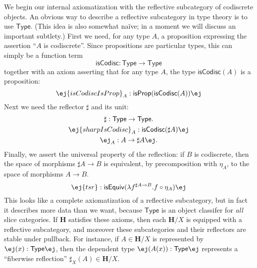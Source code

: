 \documentclass[copyright]{eptcs}
\makeatletter
\newcommand{\type}{\ensuremath{\mathsf{Type}}\xspace}
\newcommand{\ig}{\ensuremath{\infty\text{-}\mathbf{Gpd}}\xspace}
\renewcommand{\H}{\ensuremath{\mathbf{H}}\xspace}
\newcommand{\io}{\ensuremath{(\infty,1)}}
\newcommand{\sharpsub}[1]{\sharp_{\scriptscriptstyle #1}}
\def\jd#1{\@jd#1\ej}
\def\@jd#1|-#2\ej{\@@jd#1,,\;\vdash\;\left(#2\right)}
\def\@@jd#1,{\@ifmtarg{#1}{\let\next=\relax}{\left(#1\right)\let\next=\@@@jd}\next}
\def\@@@jd#1,{\@ifmtarg{#1}{\let\next=\relax}{,\,\left(#1\right)\let\next=\@@@jd}\next}
\makeatother
\begin{document}

We begin our internal axiomatization with the reflective subcategory of codiscrete objects.
An obvious
way to describe a reflective subcategory in type theory is to use \type.
(This idea is also somewhat na\"ive; in a moment we will discuss an important subtlety.)
First we need, for any type $A$, a proposition expressing the assertion ``$A$ is codiscrete''.
Since propositions are particular types, this can simply be a function term
\begin{equation}
  \mathsf{isCodisc} : \type \to \type
\end{equation}
together with an axiom asserting that for any type $A$, the type $\mathsf{isCodisc}(A)$ is a proposition:
\begin{equation}
  \jd{A:\type |- \mathsf{isCodiscIsProp}_A : \mathsf{isProp} (\mathsf{isCodisc}(A))}
\end{equation}
Next we need the reflector $\sharp$ and its unit:
\begin{gather}
\sharp : \type\to\type.\\
\jd{A:\type |- \mathsf{sharpIsCodisc}_A : \mathsf{isCodisc}(\sharp A)}\\
  \jd{A:\type |- \eta_A : A \to \sharp A}.  \label{SharpUnit}
\end{gather}
Finally, we assert the universal property of the reflection: if $B$ is codiscrete, then the space of morphisms $\sharp A \to B$ is equivalent, by precomposition with $\eta_A$, to the space of morphisms $A\to B$.
\begin{equation}
  \jd{A:\type, B:\type, \mathsf{bc} : \mathsf{isCodisc}(B) |-
    \mathsf{tsr} : \mathsf{isEquiv} (\lambda f^{\sharp A\to B}. f\circ \eta_A)
  }\label{eq:tsr}
\end{equation}
This looks like a complete axiomatization of a reflective subcategory, but in fact it describes more data than we want, because \type is an object classifer for \emph{all} slice categories.
If \H satisfies these axioms, then each $\H/X$ is equipped with a reflective subcategory, and moreover these subcategories and their reflectors are stable under pullback.
For instance, if $A\in\H/X$ is represented by $\jd{x:X |- A(x):\type}$, then the dependent type $\jd{x:X |- \sharp(A(x)):\type}$ represents a ``fiberwise reflection'' $\sharpsub{X}(A) \in \H/X$.
\end{document}
